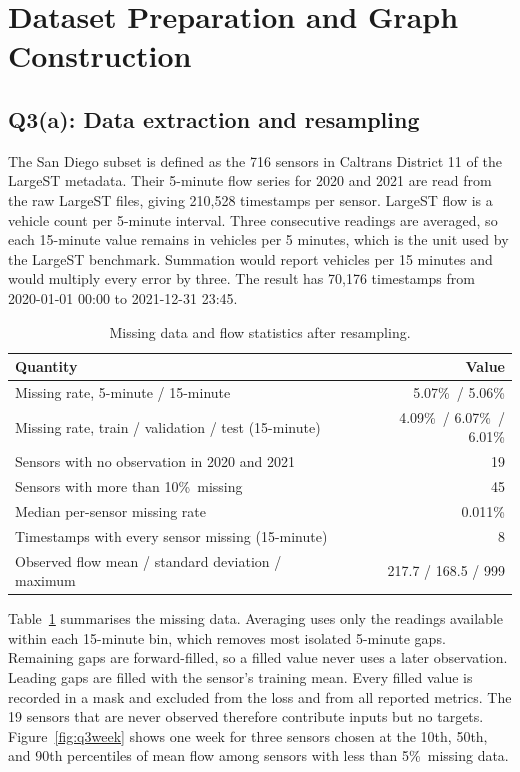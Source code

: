 \documentclass{article}
\newcommand{\pct}{\%\ }
\begin{document}
\section{Dataset Preparation and Graph Construction}
\label{sec:q3}

\subsection*{Q3(a): Data extraction and resampling}

The San Diego subset is defined as the 716 sensors in Caltrans District 11 of the LargeST metadata. Their 5-minute flow series for 2020 and 2021 are read from the raw LargeST files, giving 210,528 timestamps per sensor. LargeST flow is a vehicle count per 5-minute interval. Three consecutive readings are averaged, so each 15-minute value remains in vehicles per 5 minutes, which is the unit used by the LargeST benchmark. Summation would report vehicles per 15 minutes and would multiply every error by three. The result has 70,176 timestamps from 2020-01-01 00:00 to 2021-12-31 23:45.

\begin{table}[htbp]
\centering
\caption{Missing data and flow statistics after resampling.}
\label{tab:missing}
\footnotesize
\begin{tabular}{lr}
\toprule
Quantity & Value \\
\midrule
Missing rate, 5-minute / 15-minute & 5.07\pct / 5.06\% \\
Missing rate, train / validation / test (15-minute) & 4.09\pct / 6.07\pct / 6.01\% \\
Sensors with no observation in 2020 and 2021 & 19 \\
Sensors with more than 10\pct missing & 45 \\
Median per-sensor missing rate & 0.011\% \\
Timestamps with every sensor missing (15-minute) & 8 \\
Observed flow mean / standard deviation / maximum & 217.7 / 168.5 / 999 \\
\bottomrule
\end{tabular}
\end{table}

Table~\ref{tab:missing} summarises the missing data. Averaging uses only the readings available within each 15-minute bin, which removes most isolated 5-minute gaps. Remaining gaps are forward-filled, so a filled value never uses a later observation. Leading gaps are filled with the sensor's training mean. Every filled value is recorded in a mask and excluded from the loss and from all reported metrics. The 19 sensors that are never observed therefore contribute inputs but no targets. Figure~\ref{fig:q3week} shows one week for three sensors chosen at the 10th, 50th, and 90th percentiles of mean flow among sensors with less than 5\pct missing data.
\end{document}
